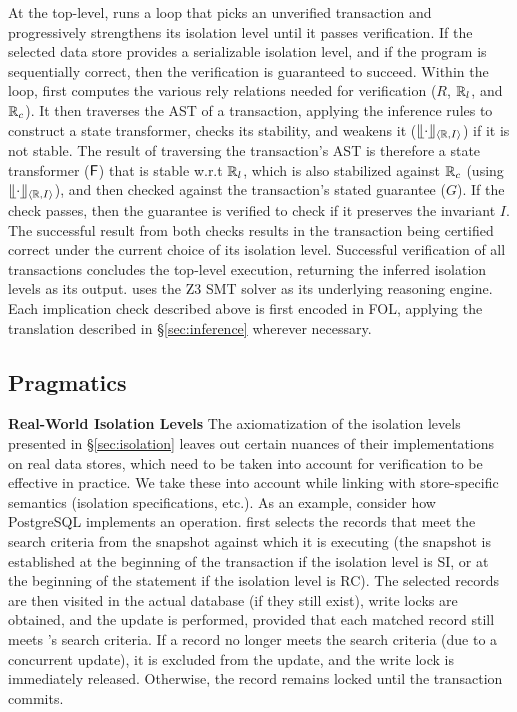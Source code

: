 At the top-level, \thetool runs a loop that picks an unverified
transaction and progressively strengthens its isolation level until it
passes verification. If the selected data store provides a
serializable isolation level, and if the program is sequentially
correct, then the verification is guaranteed to succeed. Within the
loop, \thetool first computes the various rely relations needed for
verification ($R$, $\mathbb{R}_l$, and $\mathbb{R}_c$). It then traverses the AST of a
transaction, applying the inference rules to construct a state
transformer, checks its stability, and weakens it ($\llfloor \cdot \rrfloor_{\langle \mathbb{R},I \rangle}$)
if it is not stable. The result of traversing the transaction's AST is
therefore a state transformer (${\sf F}$) that is stable w.r.t $\mathbb{R}_l$, which
is also stabilized against $\mathbb{R}_c$ (using $\llfloor \cdot \rrfloor_{\langle \mathbb{R},I \rangle}$), and
then checked against the transaction's stated guarantee ($G$). If the
check passes, then the guarantee is verified to check if it preserves
the invariant $I$. The successful result from both checks results
in the transaction being certified correct under the current choice of
its isolation level. Successful verification of all transactions
concludes the top-level execution, returning the inferred isolation
levels as its output.  \thetool uses the Z3 SMT solver as its underlying reasoning engine. Each
implication check described above is first encoded in FOL, applying
the translation described in \S\ref{sec:inference} wherever
necessary.

\subsection{Pragmatics}

\textbf{Real-World Isolation Levels} The axiomatization of the
isolation levels presented in \S\ref{sec:isolation} leaves out
certain nuances of their implementations on real data stores, which
need to be taken into account for verification to be effective in
practice.  We take these into account while linking \thetool with
store-specific semantics (isolation specifications, etc.). As an
example, consider how PostgreSQL implements an  operation.
 first selects the records that meet the search criteria
from the snapshot against which it is executing (the snapshot is
established at the beginning of the transaction if the isolation level
is SI, or at the beginning of the  statement if the
isolation level is RC). The selected records are then visited in the
actual database (if they still exist), write locks are obtained, and
the update is performed, provided that each matched record still meets
's search criteria. If a record no longer meets the
search criteria (due to a concurrent update), it is excluded
from the update, and the write lock is immediately released.
Otherwise, the record remains locked until the transaction commits. 

